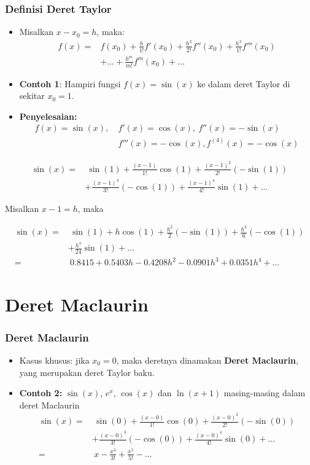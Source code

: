\documentclass[pdflatex,compress]{beamer}
\begin{document}
\begin{frame}
	\frametitle{Definisi Deret Taylor}
	\begin{itemize}
		\item Misalkan $ x - x_0 = h $, maka:
		\begin{align*}
			f(x) =& f(x_0) + \frac{h}{1!}f'(x_0) + \frac{h^2}{2!}f''(x_0) + \frac{h^3}{1!}f'''(x_0) \\
			&+ \dots + \frac{h^m}{m!}f^m(x_0) + \dots
		\end{align*}
		\item \textbf{Contoh 1}: Hampiri fungsi $ f(x) = \sin(x) $ ke dalam deret Taylor di sekitar $ x_0 = 1 $.
		\item \textbf{Penyelesaian:}
			\begin{align*}
				f(x) = \sin(x),~ &f'(x) = \cos(x),~f''(x) = -\sin(x) \\
				&f'''(x) = -\cos(x), f^{(4)}(x) = -\cos(x)
			\end{align*}
	\end{itemize}
\end{frame}

\begin{frame}
	\begin{align*}
		\sin(x) =&~ \sin(1) + \frac{(x-1)}{1!}\cos(1) + \frac{(x-1)^2}{2!}(-\sin(1)) \\
		& + \frac{(x-1)^3}{3!}(-\cos(1)) + \frac{(x-1)^4}{4!}\sin(1) + \dots
	\end{align*}

	Misalkan $ x - 1 = h $, maka
	
	\begin{align*}
		\sin(x) =&~ \sin(1) + h\cos(1) + \frac{h^2}{2}(-\sin(1)) + \frac{h^3}{6}(-\cos(1)) \\
		&+ \frac{h^4}{24}\sin(1) + \dots \\
		=&~ 0.8415 + 0.5403h - 0.4208h^2 - 0.0901h^3 + 0.0351h^4 + \dots
	\end{align*}
\end{frame}

\section{Deret Maclaurin}

\begin{frame}
	\frametitle{Deret Maclaurin}
	\begin{itemize}
		\item Kasus khusus: jika $ x_0 = 0$, maka deretnya dinamakan \textbf{Deret Maclaurin}, yang merupakan deret Taylor baku.
		\item \textbf{Contoh 2:} $ \sin(x) $, $ e^x $, $ \cos(x) $ dan $ \ln(x+1) $ masing-masing dalam deret Maclaurin
		\begin{align*}
			\sin(x) =&~ \sin(0) + \frac{(x-0)}{1!}\cos(0) + \frac{(x-0)^2}{2!}(-\sin(0)) \\
			& + \frac{(x-0)^3}{3!}(-\cos(0)) + \frac{(x-0)^4}{4!}\sin(0) + \dots \\
			=&~ x - \frac{x^3}{3!} + \frac{x^5}{5!} - \dots
		\end{align*}
	\end{itemize}
\end{frame}
\end{document}

